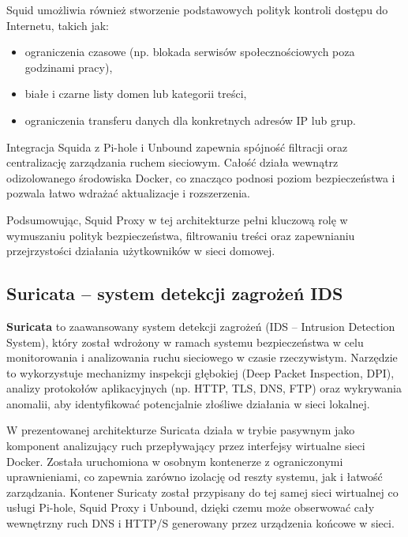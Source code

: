 \documentclass[
    left=2.5cm,         %
    right=2.5cm,        %
    top=2.5cm,          %
    bottom=3cm,         %
    bindingoffset=6mm,  %
    nohyphenation=true %
]{eiti/eiti-thesis} %
\begin{document}
Squid umożliwia również stworzenie podstawowych polityk kontroli dostępu do Internetu, takich jak:
\begin{itemize}
    \item ograniczenia czasowe (np. blokada serwisów społecznościowych poza godzinami pracy),
    \item białe i czarne listy domen lub kategorii treści,
    \item ograniczenia transferu danych dla konkretnych adresów IP lub grup.
\end{itemize}

Integracja Squida z Pi-hole i Unbound zapewnia spójność filtracji oraz centralizację zarządzania ruchem sieciowym. Całość działa wewnątrz odizolowanego środowiska Docker, co znacząco podnosi poziom bezpieczeństwa i pozwala łatwo wdrażać aktualizacje i rozszerzenia.

Podsumowując, Squid Proxy w tej architekturze pełni kluczową rolę w wymuszaniu polityk bezpieczeństwa, filtrowaniu treści oraz zapewnianiu przejrzystości działania użytkowników w sieci domowej.

\subsection{Suricata – system detekcji zagrożeń IDS}

\textbf{Suricata}\cite{suricata-wiki} to zaawansowany system detekcji zagrożeń (IDS – Intrusion Detection System), który został wdrożony w ramach systemu bezpieczeństwa w celu monitorowania i analizowania ruchu sieciowego w czasie rzeczywistym. Narzędzie to wykorzystuje mechanizmy inspekcji głębokiej (Deep Packet Inspection, DPI), analizy protokołów aplikacyjnych (np. HTTP, TLS, DNS, FTP) oraz wykrywania anomalii, aby identyfikować potencjalnie złośliwe działania w sieci lokalnej\cite{suricata-docs}.

W prezentowanej architekturze Suricata działa w trybie pasywnym jako komponent analizujący ruch przepływający przez interfejsy wirtualne sieci Docker. Została uruchomiona w osobnym kontenerze z ograniczonymi uprawnieniami, co zapewnia zarówno izolację od reszty systemu, jak i łatwość zarządzania. Kontener Suricaty został przypisany do tej samej sieci wirtualnej co usługi Pi-hole, Squid Proxy i Unbound, dzięki czemu może obserwować cały wewnętrzny ruch DNS i HTTP/S generowany przez urządzenia końcowe w sieci\cite{suricata-docs}.
\end{document}
